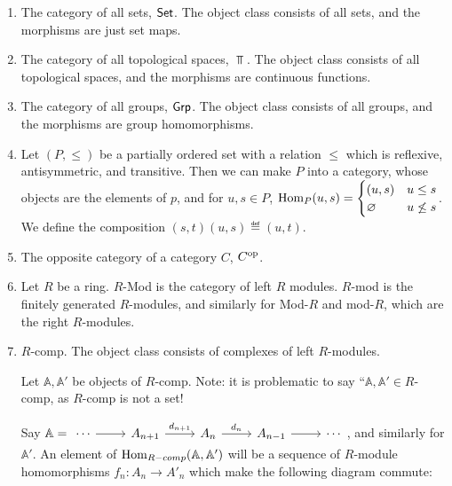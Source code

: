 \documentclass[x11names,reqno,14pt]{extarticle}
\begin{document}
\exm

\begin{enumerate}

\item The category of all sets, ${{\text{\sffamily {Set}}}}$. The object class consists of all sets, and the morphisms are just set maps. 

\item The category of all topological spaces, $\Top$. The object class consists of all topological spaces, and the morphisms are continuous functions. 

\item The category of all groups, ${{\text{\sffamily {Grp}}}}$. The object class consists of all groups, and the morphisms are group homomorphisms. 

\item Let $(P, \leq)$ be a partially ordered set with a relation $\leq$ which is reflexive, antisymmetric,  and transitive. Then we can make $P$ into a category, whose objects are the elements of $p$, and for $u, s \in P$, ${\mathrm{Hom}}_P(u, s) = \begin{cases} (u, s) & u \leq s \\ \varnothing & u\not\leq s \\ \end{cases}$. We define the composition $(s, t)(u, s) \eqdef (u, t)$. 

\item The opposite category of a category $C$, $C^{\mathrm{op}}$. 

\item Let $R$ be a ring. $R$-Mod is the category of left $R$ modules. $R$-mod is the finitely generated $R$-modules, and similarly for Mod-$R$ and mod-$R$, which are the right $R$-modules.

\item $R$-comp. The object class consists of complexes of left $R$-modules.

Let $\mathbb{A}, \mathbb{A}'$ be objects of $R$-comp. Note: it is problematic to say ``$\mathbb{A}, \mathbb{A}' \in R$-comp, as $R$-comp is not a set!

Say $\mathbb{A} = \begin{tikzcd} \cdots\ar[r] &A_{n + 1} \ar[r, "d_{n + 1}"] & A_n \ar[r, "d_n"] & A_{n - 1} \ar[r]& \cdots \end{tikzcd}$, and similarly for $\mathbb{A}'$. An element of ${\mathrm{Hom}}_{R-comp}(\mathbb{A},\mathbb{A}')$ will be a sequence of $R$-module homomorphisms $f_n:A_n\to A'_n$ which make the following diagram commute:


\end{enumerate}
\end{document}
